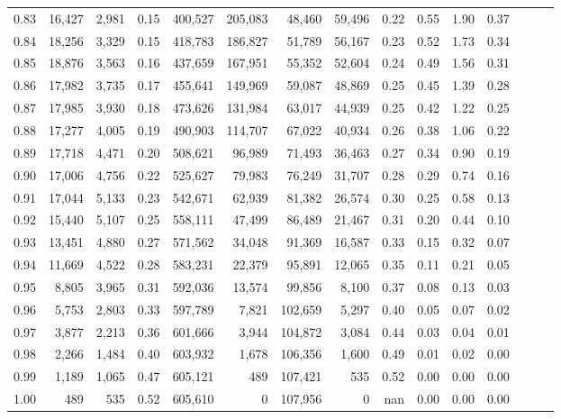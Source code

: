 \begin{tabular}{rrrrrrrrrrrrrrr}
0.83 &  16,427 &  2,981 &  0.15 &  400,527 &  205,083 &   48,460 &   59,496 &  0.22 &  0.55 &  1.90 &      0.37 \\
0.84 &  18,256 &  3,329 &  0.15 &  418,783 &  186,827 &   51,789 &   56,167 &  0.23 &  0.52 &  1.73 &      0.34 \\
0.85 &  18,876 &  3,563 &  0.16 &  437,659 &  167,951 &   55,352 &   52,604 &  0.24 &  0.49 &  1.56 &      0.31 \\
0.86 &  17,982 &  3,735 &  0.17 &  455,641 &  149,969 &   59,087 &   48,869 &  0.25 &  0.45 &  1.39 &      0.28 \\
0.87 &  17,985 &  3,930 &  0.18 &  473,626 &  131,984 &   63,017 &   44,939 &  0.25 &  0.42 &  1.22 &      0.25 \\
0.88 &  17,277 &  4,005 &  0.19 &  490,903 &  114,707 &   67,022 &   40,934 &  0.26 &  0.38 &  1.06 &      0.22 \\
0.89 &  17,718 &  4,471 &  0.20 &  508,621 &   96,989 &   71,493 &   36,463 &  0.27 &  0.34 &  0.90 &      0.19 \\
0.90 &  17,006 &  4,756 &  0.22 &  525,627 &   79,983 &   76,249 &   31,707 &  0.28 &  0.29 &  0.74 &      0.16 \\
0.91 &  17,044 &  5,133 &  0.23 &  542,671 &   62,939 &   81,382 &   26,574 &  0.30 &  0.25 &  0.58 &      0.13 \\
0.92 &  15,440 &  5,107 &  0.25 &  558,111 &   47,499 &   86,489 &   21,467 &  0.31 &  0.20 &  0.44 &      0.10 \\
0.93 &  13,451 &  4,880 &  0.27 &  571,562 &   34,048 &   91,369 &   16,587 &  0.33 &  0.15 &  0.32 &      0.07 \\
0.94 &  11,669 &  4,522 &  0.28 &  583,231 &   22,379 &   95,891 &   12,065 &  0.35 &  0.11 &  0.21 &      0.05 \\
0.95 &   8,805 &  3,965 &  0.31 &  592,036 &   13,574 &   99,856 &    8,100 &  0.37 &  0.08 &  0.13 &      0.03 \\
0.96 &   5,753 &  2,803 &  0.33 &  597,789 &    7,821 &  102,659 &    5,297 &  0.40 &  0.05 &  0.07 &      0.02 \\
0.97 &   3,877 &  2,213 &  0.36 &  601,666 &    3,944 &  104,872 &    3,084 &  0.44 &  0.03 &  0.04 &      0.01 \\
0.98 &   2,266 &  1,484 &  0.40 &  603,932 &    1,678 &  106,356 &    1,600 &  0.49 &  0.01 &  0.02 &      0.00 \\
0.99 &   1,189 &  1,065 &  0.47 &  605,121 &      489 &  107,421 &      535 &  0.52 &  0.00 &  0.00 &      0.00 \\
1.00 &     489 &    535 &  0.52 &  605,610 &        0 &  107,956 &        0 &   nan &  0.00 &  0.00 &      0.00 \\
\bottomrule
\end{tabular}
